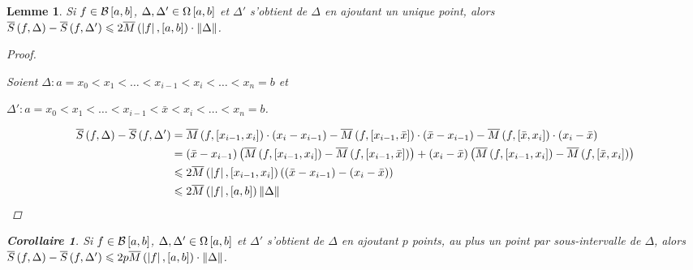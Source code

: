 \documentclass{report}
\newcommand*{\norme}[1]{\left\| #1 \right\|}
\newcommand*{\abs}[1]{\left| #1 \right|}
\newcommand*{\lte}{\leqslant}
\newtheorem*{lem}{Lemme}
\newtheorem*{coro}{Corollaire}
\theoremstyle{definition}
\theoremstyle{remark}
\begin{document}
	\begin{lem}
		Si $f \in \bornee$, $\Delta,\Delta' \in \partitions$ et $\Delta'$ s'obtient de $\Delta$ en ajoutant un unique point, alors $\ssup{f} - \ssup{f}[\Delta'] \lte 2\msup{\abs{f}}[a,b] \cdot \norme{\Delta}$.

		\begin{proof}~

			Soient $\Delta:a=x_0 < x_1 < \dotsc < x_{i-1} < x_i < \dotsc < x_n=b$ et
			
			$\Delta':a=x_0 < x_1 < \dotsc < x_{i-1} < \bar{x} < x_i < \dotsc < x_n=b$.

			\begin{align*}
				\ssup{f} - \ssup{f}[\Delta'] &= \msup{f}[x_{i-1},x_i] \cdot \left( x_i-x_{i-1} \right) - \msup{f}[x_{i-1},\bar{x}] \cdot \left( \bar{x}-x_{i-1} \right) - \msup{f}[\bar{x},x_i] \cdot \left( x_i-\bar{x} \right)\\
				&= \left( \bar{x}-x_{i-1} \right) \left( \msup{f}[x_{i-1},x_i] - \msup{f}[x_{i-1},\bar{x}] \right) + \left( x_i-\bar{x} \right) \left( \msup{f}[x_{i-1},x_i] - \msup{f}[\bar{x},x_i] \right)\\
				&\lte 2\msup{\abs{f}}[x_{i-1},x_i] \left( \left( \bar{x}-x_{i-1} \right) - \left( x_i-\bar{x} \right) \right)\\
				&\lte 2\msup{\abs{f}} \norme{\Delta}
			\end{align*}
		\end{proof}

		\begin{coro}
			Si $f \in \bornee$, $\Delta,\Delta' \in \partitions$ et $\Delta'$ s'obtient de $\Delta$ en ajoutant $p$ points, au plus un point par sous-intervalle de $\Delta$, alors $\ssup{f} - \ssup{f}[\Delta'] \lte 2p\msup{\abs{f}}[a,b] \cdot \norme{\Delta}$.
		\end{coro}
	\end{lem}
\end{document}
